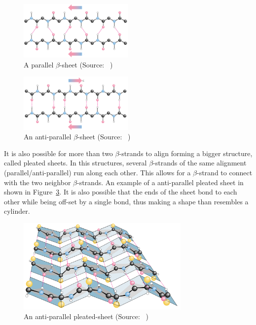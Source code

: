 \begin{figure}[htbp]
    \centering
    \includegraphics[width=0.5\textwidth]{Figuras/parallel-beta-sheet.png}
    \caption{A parallel $\beta$-sheet (Source: ~\cite{garrett1999biochemistry})}
    \label{fig:parallel-beta-sheet}
\end{figure}

\begin{figure}[htbp]
    \centering
    \includegraphics[width=0.5\textwidth]{Figuras/anti-parallel-beta-sheet.png}
    \caption{An anti-parallel $\beta$-sheet (Source: ~\cite{garrett1999biochemistry})}
    \label{fig:anti-parallel-beta-sheet}
\end{figure}

It is also possible for more than two $\beta$-strands to align forming a bigger
structure, called pleated sheets. In this structures, several $\beta$-strands
of the same alignment (parallel/anti-parallel) run along each other. This
allows for a $\beta$-strand to connect with the two neighbor $\beta$-strands.
An example of a anti-parallel pleated sheet in shown in
Figure~\ref{fig:pleated-sheet}. It is also possible that the ends of the sheet
bond to each other while being off-set by a single bond, thus making a shape
than resembles a cylinder.

\begin{figure}[htpb]
    \centering
    \includegraphics[width=0.75\textwidth]{Figuras/pleated-sheet.png}
    \caption{An anti-parallel pleated-sheet (Source: ~\cite{garrett1999biochemistry})}
    \label{fig:pleated-sheet}
\end{figure}

